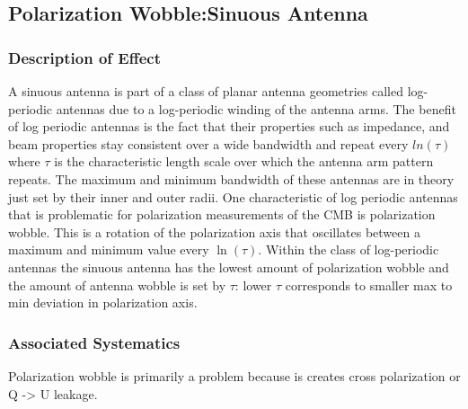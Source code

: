 \subsection{Polarization Wobble:Sinuous Antenna}

\subsubsection{Description of Effect}
A sinuous antenna is part of a class of planar antenna geometries called log-periodic antennas due to a log-periodic winding of the antenna arms. The benefit of log periodic antennas is the fact that their properties such as impedance, and beam properties stay consistent over a wide bandwidth and repeat every $ln(\tau)$ where $\tau$ is the characteristic length scale over which the antenna arm pattern repeats. The maximum and minimum bandwidth of these antennas are in theory just set by their inner and outer radii. One characteristic of log periodic antennas that is problematic for polarization measurements of the CMB is polarization wobble. This is a rotation of the polarization axis that oscillates between a maximum and minimum value every $\ln(\tau)$. Within the class of log-periodic antennas the sinuous antenna has the lowest amount of polarization wobble and the amount of antenna wobble is set by $\tau$: lower $\tau$ corresponds to smaller max to min deviation in polarization axis.
\subsubsection{Associated Systematics}
Polarization wobble is primarily a problem because is creates cross polarization or Q -> U leakage.

